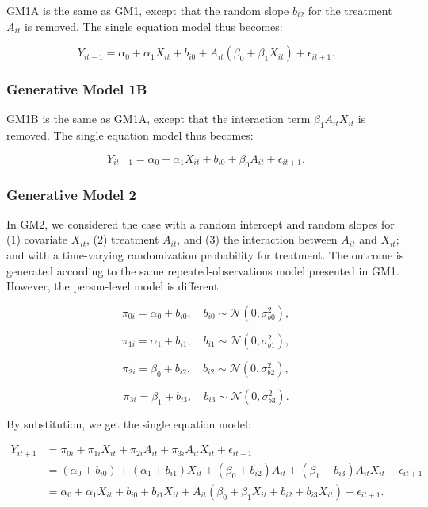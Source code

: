 \documentclass[
  12pt,
  a4paper,
]{article}
\begin{document}
GM1A is the same as GM1, except that the random slope \(b_{i2}\) for the
treatment \(A_{it}\) is removed. The single equation model thus becomes:

\[
Y_{it+1} = \alpha_0 + \alpha_1 X_{it} + b_{i0} + A_{it} (\beta_0 + \beta_1 X_{it}) + \epsilon_{it+1}.
\]

\subsubsection{Generative Model 1B}\label{generative-model-1b}

GM1B is the same as GM1A, except that the interaction term
\(\beta_1 A_{it} X_{it}\) is removed. The single equation model thus
becomes:

\[
Y_{it+1} = \alpha_0 + \alpha_1 X_{it} + b_{i0} + \beta_0 A_{it}  + \epsilon_{it+1}.
\]

\subsubsection{Generative Model 2}\label{generative-model-2}

In GM2, we considered the case with a random intercept and random slopes
for (1) covariate \(X_{it}\), (2) treatment \(A_{it}\), and (3) the
interaction between \(A_{it}\) and \(X_{it}\); and with a time-varying
randomization probability for treatment. The outcome is generated
according to the same repeated-observations model presented in GM1.
However, the person-level model is different:

\[
\pi_{0i} = \alpha_0 + b_{i0}, \quad b_{i0} \sim \mathcal{N}(0, \sigma_{b0}^2),
\]

\[
\pi_{1i} = \alpha_1 + b_{i1}, \quad b_{i1} \sim \mathcal{N}(0, \sigma_{b1}^2),
\]

\[
\pi_{2i} = \beta_0 + b_{i2}, \quad b_{i2} \sim \mathcal{N}(0, \sigma_{b2}^2),
\]

\[
\pi_{3i} = \beta_1 + b_{i3}, \quad b_{i3} \sim \mathcal{N}(0, \sigma_{b3}^2).
\]

By substitution, we get the single equation model:

\[
\begin{aligned}
Y_{it+1} &= \pi_{0i} + \pi_{1i} X_{it} + \pi_{2i} A_{it} + \pi_{3i} A_{it} X_{it} + \epsilon_{it+1} \\ 
&= (\alpha_0 + b_{i0}) + (\alpha_1 + b_{i1}) X_{it} + (\beta_0 + b_{i2}) A_{it} + (\beta_1 + b_{i3}) A_{it} X_{it} + \epsilon_{it+1} \\ 
&= \alpha_0 + \alpha_1 X_{it} + b_{i0} + b_{i1} X_{it} + A_{it} \left( \beta_0 + \beta_1 X_{it} + b_{i2} + b_{i3} X_{it} \right) + \epsilon_{it+1}.
\end{aligned}
\]
\end{document}
